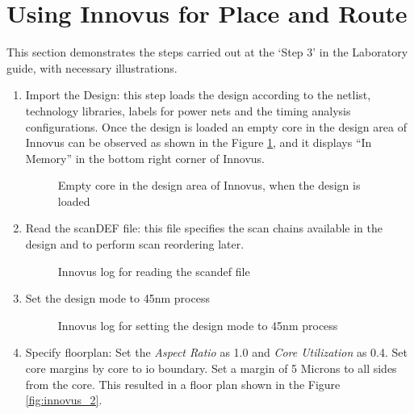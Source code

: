 \documentclass[a4paper,11pt]{article}%
\begin{document}
\pagebreak
\section{Using Innovus for Place and Route}
This section demonstrates the steps carried out at the `Step 3' in the Laboratory guide, with necessary illustrations.

\begin{enumerate}[1.)]
	\item Import the Design: this step loads the design according to the netlist, technology libraries, labels for power nets and the timing analysis configurations. Once the design is loaded an empty core in the design area of Innovus can be observed as shown in the Figure \ref{fig:innovus_1},  and it displays ``In Memory'' in the bottom right corner of Innovus.
	
	\begin{figure}[h]
		\centering
		\caption{Empty core in the design area of Innovus, when the design is loaded}
		\label{fig:innovus_1}
	\end{figure}
	
	
	\item  Read the scanDEF file: this file specifies the scan chains available in the design and to perform scan reordering later.
	
	\begin{figure}[h]
		\centering
		\caption{Innovus log for reading the scan\ac{def} file}
		\label{fig:defIn}
	\end{figure}
	
	\item Set the design mode to 45nm process
	
	\begin{figure}[h]
		\centering
		\caption{Innovus log for setting the design mode to 45nm process}
		\label{fig:setDesignMode}
	\end{figure}
	\pagebreak
	\item Specify floorplan: Set the \textit{Aspect Ratio} as 1.0 and \textit{Core Utilization} as 0.4.  Set core margins by core to \ac{io} boundary. Set a margin of 5 Microns to all sides from the core. This resulted in a floor plan shown in the Figure \ref{fig:innovus_2}.
	

\end{enumerate}
\end{document}
